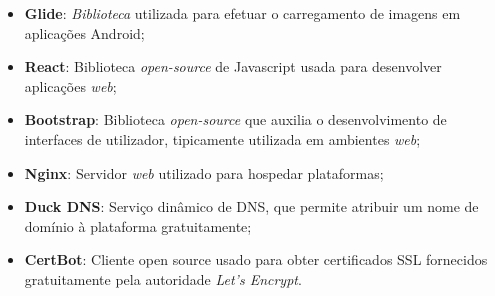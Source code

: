 \begin{itemize}
	\item \textbf{Glide}: \textit{Biblioteca} utilizada para efetuar o carregamento de imagens em aplicações Android;
	\item \textbf{React}: Biblioteca \textit{open-source} de Javascript usada para desenvolver aplicações \textit{web};
	\item \textbf{Bootstrap}: Biblioteca \textit{open-source} que auxilia o desenvolvimento de interfaces de utilizador, tipicamente utilizada em ambientes \textit{web};
	\item \textbf{Nginx}: Servidor \textit{web} utilizado para hospedar plataformas;
	\item \textbf{Duck DNS}: Serviço dinâmico de DNS, que permite atribuir um nome de domínio à plataforma gratuitamente;
	\item \textbf{CertBot}: Cliente open source usado para obter certificados SSL fornecidos gratuitamente pela autoridade \textit{Let's Encrypt}.
\end{itemize}